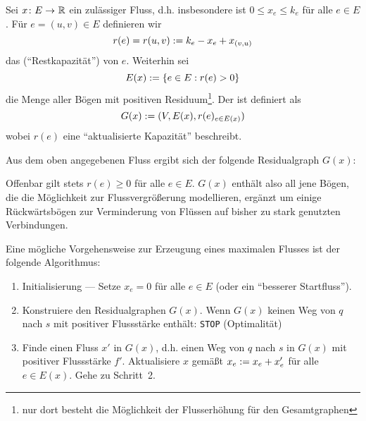 \begin{definition}
	Sei $\abb{x}{E}{\R}$ ein zulässiger Fluss, d.h. insbesondere ist $0 \le x_e \le k_e$ für alle $e \in E$. Für $e = (u,v) \in E$ definieren wir
	\begin{equation*}
		r(e) = r(u,v) \mathrel{:=} k_e - x_e + x_{(v,u)}
	\end{equation*}
	das  (\enquote{Restkapazität}) von $e$.
	Weiterhin sei
	\begin{equation*}
		E(x) \mathrel{:=} \left\{ e \in E : r(e) > 0 \right\}
	\end{equation*}
	die Menge aller Bögen mit positiven Residuum\footnote{nur dort besteht die Möglichkeit der Flusserhöhung für den Gesamtgraphen}. Der  ist definiert als 
	\begin{equation*}
		G(x) \mathrel{:=} (V, E(x), r(e)_{e \in E(x)})
	\end{equation*}
	wobei $r(e)$ eine \enquote{aktualisierte Kapazität} beschreibt.
\end{definition}

\begin{beispiel}
	Aus dem oben angegebenen Fluss ergibt sich der folgende Residualgraph $G(x)$:
	
	Offenbar gilt stets $r(e) \ge 0$ für alle $e \in E$. $G(x)$ enthält also all jene Bögen, die die Möglichkeit zur Flussvergrößerung modellieren, ergänzt um einige Rückwärtsbögen zur Verminderung von Flüssen auf bisher zu stark genutzten Verbindungen.
\end{beispiel}

Eine mögliche Vorgehensweise zur Erzeugung eines maximalen Flusses ist der folgende Algorithmus:

\begin{enumerate}[label=Schritt \arabic*:, leftmargin=*, start=1]
	\item Initialisierung --- Setze $x_e = 0$ für alle $e \in E$ (oder ein \enquote{besserer Startfluss}).
	\item Konstruiere den Residualgraphen $G(x)$. Wenn $G(x)$ keinen Weg von $q$ nach $s$ mit positiver Flussstärke enthält: \texttt{STOP} (Optimalität)
	\item Finde einen Fluss $x'$ in $G(x)$, d.h. einen Weg von $q$ nach $s$ in $G(x)$ mit positiver Flussstärke $f'$. Aktualisiere $x$ gemäßt $x_e \mathrel{:=} x_e + x_e'$ für alle $e \in E(x)$. Gehe zu Schritt~2.
\end{enumerate}

